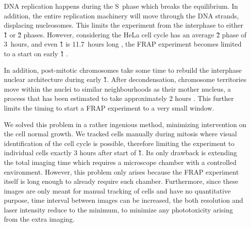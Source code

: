       DNA replication happens during the S~phase which breaks the equilibrium.
      In addition, the entire replication machinery will move through the DNA
      strands, displacing nucleosomes. This limits the experiment from the
      interphase to either \G1{} or \G2{} phases. However, considering
      the HeLa cell cycle has an average \G2{} phase of 3~hours, and even
      \G1{} is 11.7~hours long \citep{HeLaCellCycle}, the FRAP experiment
      becomes limited to a start on early \G1{} .


      In addition, post-mitotic chromosomes take some time to rebuild the
      interphase nuclear architecture during early \G1{}. After decondensation,
      chromosome territories move within the nuclei to similar neighbourhoods
      as their mother nucleus, a process that has been estimated to
      take approximately 2 hours
      \citep{visualizationG1chromosomes,earlyg1position,RelativeChromosomePosition}.
      This further limits the timing to start a FRAP experiment to a very
      small window.

      We solved this problem in a rather ingenious method, minimizing
      intervention on the cell normal growth. We tracked cells manually during
      mitosis where visual identification of the cell cycle is possible,
      therefore limiting the experiment to individual cells exactly 3 hours
      after start of \G1{}.
      Its only drawback is extending the total imaging time which
      requires a microscope chamber with a controlled environment.
      However, this problem only arises because the FRAP experiment itself
      is long enough to already require such chamber. Furthermore, since these
      images are only meant for manual tracking of cells and have no
      quantitative purpose, time interval between images can be increased,
      the both resolution and laser intensity reduce to the minimum, to
      minimize any phototoxicity arising from the extra imaging.


